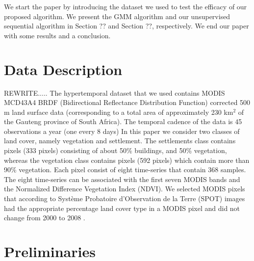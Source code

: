 \documentclass{article}
\begin{document}
\noindent
We start the paper by introducing the dataset we used to test the efficacy of our proposed algorithm. We present the GMM algorithm and our unsupervised sequential algorithm in Section ?? and 
Section ??, respectively. We end our paper with some results and a conclusion.

\section{Data Description}
\label{sec:data}
REWRITE.....
The hypertemporal dataset that we used contains MODIS MCD43A4 BRDF (Bidirectional Reflectance Distribution Function) corrected 500 m land surface
data (corresponding to a total area of approximately 230 km$^2$ of the Gauteng province of South Africa). The temporal cadence of the data is 45 observations a year (one every 8 days) In this paper we consider two classes of land cover, namely vegetation and settlement. The settlements class contains pixels (333 pixels) consisting of about
50\% buildings, and 50\% vegetation, whereas the vegetation class contains pixels (592 pixels) which contain more than 90\% vegetation. Each pixel consist of eight time-series that contain 368 samples. The eight time-series can be associated with the first seven MODIS bands and the Normalized Difference Vegetation Index (NDVI).
We selected MODIS pixels that according to Système Probatoire d’Observation de la Terre (SPOT) images had the appropriate percentage land cover type in a MODIS pixel and did not change from 2000 to 2008 \cite{grobler2012}.


\section{Preliminaries}
\end{document}
